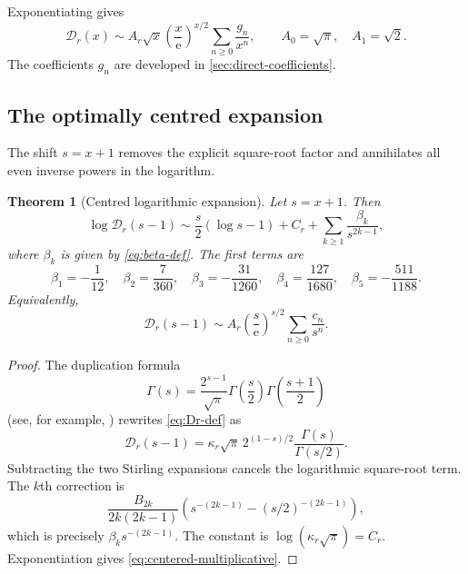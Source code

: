 \documentclass[11pt,a4paper,oneside]{article}
\theoremstyle{plain}
\newtheorem{theorem}{Theorem}[section]
\theoremstyle{definition}
\theoremstyle{remark}
\newcommand{\e}{\mathrm e}
\newcommand{\D}{\mathcal D}
\begin{document}
Exponentiating gives
\begin{equation}
 \D_r(x)
 \sim A_r\sqrt{x}\left(\frac{x}{\e}\right)^{x/2}
 \sum_{n\ge0}\frac{g_n}{x^n},
 \qquad A_0=\sqrt\pi,\quad A_1=\sqrt2.
 \label{eq:uncentred-multiplicative}
\end{equation}
The coefficients $g_n$ are developed in \cref{sec:direct-coefficients}.

\subsection{The optimally centred expansion}

The shift $s=x+1$ removes the explicit square-root factor and annihilates all
even inverse powers in the logarithm.

\begin{theorem}[Centred logarithmic expansion]
\label{thm:centered-log}
Let $s=x+1$.  Then
\begin{equation}
 \log\D_r(s-1)
 \sim \frac{s}{2}(\log s-1)+C_r
 +\sum_{k\ge1}\frac{\beta_k}{s^{2k-1}},
 \label{eq:centered-log}
\end{equation}
where $\beta_k$ is given by \cref{eq:beta-def}.  The first terms are
\begin{equation}
 \beta_1=-\frac1{12},\quad
 \beta_2=\frac7{360},\quad
 \beta_3=-\frac{31}{1260},\quad
 \beta_4=\frac{127}{1680},\quad
 \beta_5=-\frac{511}{1188}.
 \label{eq:beta-first}
\end{equation}
Equivalently,
\begin{equation}
 \D_r(s-1)
 \sim A_r\left(\frac{s}{\e}\right)^{s/2}
 \sum_{n\ge0}\frac{c_n}{s^n}.
 \label{eq:centered-multiplicative}
\end{equation}
\end{theorem}

\begin{proof}
The duplication formula
\begin{equation}
 \Gamma(s)=\frac{2^{s-1}}{\sqrt\pi}
 \Gamma\!\left(\frac{s}{2}\right)
 \Gamma\!\left(\frac{s+1}{2}\right)
 \label{eq:duplication}
\end{equation}
(see, for example, \cite{DLMFDuplication})
rewrites \cref{eq:Dr-def} as
\begin{equation}
 \D_r(s-1)=\kappa_r\sqrt\pi\,2^{(1-s)/2}
 \frac{\Gamma(s)}{\Gamma(s/2)}.
 \label{eq:Dr-ratio}
\end{equation}
Subtracting the two Stirling expansions cancels the logarithmic square-root
term.  The $k$th correction is
\[
 \frac{B_{2k}}{2k(2k-1)}
 \left(s^{-(2k-1)}-(s/2)^{-(2k-1)}\right),
\]
which is precisely $\beta_ks^{-(2k-1)}$.  The constant is
$\log(\kappa_r\sqrt\pi)=C_r$.  Exponentiation gives
\cref{eq:centered-multiplicative}.
\end{proof}
\end{document}
